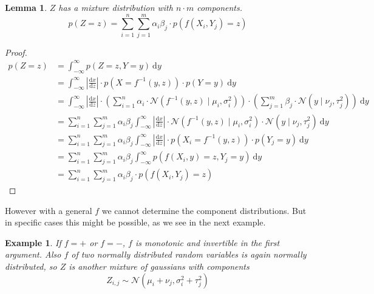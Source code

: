 \documentclass[11pt,a4paper]{report}
\newtheorem{lemma}{Lemma}
\newtheorem{example}{Example}
\begin{document}
\begin{lemma}
  $Z$ has a mixture distribution with $n \cdot m$ components.
  \begin{equation*}
    p(Z = z) = \sum_{i = 1}^{n} \sum_{j = 1}^{m} \alpha_{i}\beta_{j} \cdot p(f(X_{i}, Y_{j}) = z)
  \end{equation*}
\end{lemma}
\begin{proof}
  \begin{align*}
    p(Z = z) & = \int_{-\infty}^{\infty} p(Z = z, Y = y)~\mathrm{d}y\\
             & = \int_{-\infty}^{\infty} \left| \frac{\mathrm{d}x}{\mathrm{d}z} \right| \cdot p(X = f^{-1}(y, z)) \cdot p(Y = y)~\mathrm{d}y\\
             & = \int_{-\infty}^{\infty} \left| \frac{\mathrm{d}x}{\mathrm{d}z} \right| \cdot \left( \sum_{i = 1}^{n} \alpha_{i} \cdot \mathcal{N}(f^{-1}(y, z) \mid \mu_{i}, \sigma_{i}^{2}) \right) \cdot \left( \sum_{j = 1}^{m} \beta_{j} \cdot \mathcal{N}(y \mid \nu_{j}, \tau_{j}^{2}) \right)~\mathrm{d}y\\
             & = \sum_{i = 1}^{n} \sum_{j = 1}^{m} \alpha_{i}\beta_{j} \int_{-\infty}^{\infty} \left| \frac{\mathrm{d}x}{\mathrm{d}z} \right| \cdot \mathcal{N}(f^{-1}(y, z) \mid \mu_{i}, \sigma_{i}^{2}) \cdot \mathcal{N}(y \mid \nu_{j}, \tau_{j}^{2})~\mathrm{d}y\\
             & = \sum_{i = 1}^{n} \sum_{j = 1}^{m} \alpha_{i}\beta_{j} \int_{-\infty}^{\infty} \left| \frac{\mathrm{d}x}{\mathrm{d}z} \right| \cdot p(X_{i} = f^{-1}(y, z)) \cdot p(Y_{j} = y)~\mathrm{d}y\\
             & = \sum_{i = 1}^{n} \sum_{j = 1}^{m} \alpha_{i}\beta_{j} \int_{-\infty}^{\infty} p(f(X_{i}, y) = z, Y_{j} = y)~\mathrm{d}y\\
             & = \sum_{i = 1}^{n} \sum_{j = 1}^{m} \alpha_{i}\beta_{j} \cdot p(f(X_{i}, Y_{j}) = z)
  \end{align*}
\end{proof}

However with a general $f$ we cannot determine the component distributions. But
in specific cases this might be possible, as we see in the next example.

\begin{example}
  If $f = +$ or $f = -$, $f$ is monotonic and invertible in the first
  argument. Also $f$ of two normally distributed random variables is again
  normally distributed, so $Z$ is another mixture of gaussians with components
  \begin{equation*}
    Z_{i,j} \sim \mathcal{N}(\mu_{i} + \nu_{j}, \sigma_{i}^{2} + \tau_{j}^{2})
  \end{equation*}
\end{example}
\end{document}
